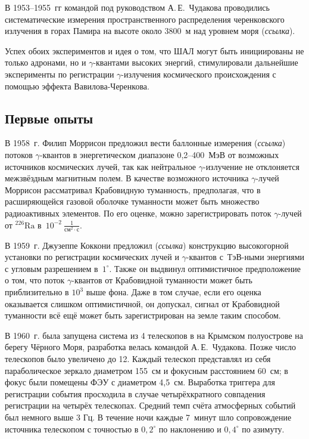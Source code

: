 \documentclass[magd,floatypics,numeref]{msudipl} %
\begin{document}
В 1953--1955~гг командой под руководством А.\,Е.~Чудакова проводились систематические измерения пространственного распределения черенковского излучения в горах Памира на высоте около 3800~м над уровнем моря (\textit{ссылка}).

Успех обоих экспериментов и идея о том, что ШАЛ могут быть инициированы не только адронами, но и $\gamma$-квантами высоких энергий, стимулировали дальнейшие эксперименты по регистрации $\gamma$-излучения космического происхождения с помощью эффекта Вавилова-Черенкова. 
\subsection{Первые опыты}
В 1958~г. Филип Моррисон предложил вести баллонные измерения  (\textit{ссылка}) потоков $\gamma$-квантов в энергетическом диапазоне 0,2--400~МэВ от возможных источников космических лучей, так как нейтральное  $\gamma$-излучение не отклоняется межзвёздным магнитным полем. В качестве возможного источника $\gamma$-лучей Моррисон рассматривал Крабовидную туманность, предполагая, что в расширяющейся газовой оболочке туманности может быть множество радиоактивных элементов. По его оценке, можно зарегистрировать поток $\gamma$-лучей от $^{226}\text{Ra}$ в~$10^{-2}~\frac{1}{\text{см}^2\cdot\text{с}}$.

В 1959~г. Джузеппе Коккони предложил  (\textit{ссылка}) конструкцию высокогорной установки по регистрации космических лучей и $\gamma$-квантов с~ТэВ-ными энергиями с угловым разрешением в~$1^\circ$. Также он выдвинул оптимистичное предположение о том, что поток $\gamma$-квантов от Крабовидной туманности может быть приблизительно в $10^3$  выше фона. Даже в том случае, если его оценка оказывается слишком оптимистичной, он допускал, сигнал от Крабовидной туманности всё ещё может быть зарегистрирован на земле таким способом. 

В 1960~г. была запущена система из 4 телескопов в на Крымском полуострове на берегу Чёрного Моря, разработка велась командой А.\,Е.~Чудакова. Позже число телескопов было увеличено до 12. Каждый телескоп представлял из себя параболическое зеркало диаметром 155~см и фокусным расстоянием 60~см; в фокус были помещены ФЭУ с диаметром 4,5~см. Выработка триггера для регистрации события просходила в случае четырёхкратного совпадения регистрации на четырёх телескопах. Средний темп счёта атмосферных событий был немного выше  3 Гц. В течение ночи каждые 7~минут шло сопровождение источника телескопом с точностью в $0,2^{\circ}$ по наклонению и $0,4^{\circ}$ по азимуту.
\end{document}
